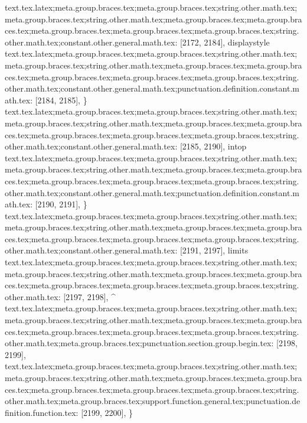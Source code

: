 {{{{{{{{{{{{{{{{{{{{{{{{{{{{{{{{{{{{{{{{{{{{{{{{{{{{{{{{{{{{{{{{text.tex.latex;meta.group.braces.tex;meta.group.braces.tex;string.other.math.tex;meta.group.braces.tex;string.other.math.tex;meta.group.braces.tex;meta.group.braces.tex;meta.group.braces.tex;meta.group.braces.tex;meta.group.braces.tex;string.other.math.tex;constant.other.general.math.tex: [2172, 2184], {displaystyle}
text.tex.latex;meta.group.braces.tex;meta.group.braces.tex;string.other.math.tex;meta.group.braces.tex;string.other.math.tex;meta.group.braces.tex;meta.group.braces.tex;meta.group.braces.tex;meta.group.braces.tex;meta.group.braces.tex;string.other.math.tex;constant.other.general.math.tex;punctuation.definition.constant.math.tex: [2184, 2185], {\}
text.tex.latex;meta.group.braces.tex;meta.group.braces.tex;string.other.math.tex;meta.group.braces.tex;string.other.math.tex;meta.group.braces.tex;meta.group.braces.tex;meta.group.braces.tex;meta.group.braces.tex;meta.group.braces.tex;string.other.math.tex;constant.other.general.math.tex: [2185, 2190], {intop}
text.tex.latex;meta.group.braces.tex;meta.group.braces.tex;string.other.math.tex;meta.group.braces.tex;string.other.math.tex;meta.group.braces.tex;meta.group.braces.tex;meta.group.braces.tex;meta.group.braces.tex;meta.group.braces.tex;string.other.math.tex;constant.other.general.math.tex;punctuation.definition.constant.math.tex: [2190, 2191], {\}
text.tex.latex;meta.group.braces.tex;meta.group.braces.tex;string.other.math.tex;meta.group.braces.tex;string.other.math.tex;meta.group.braces.tex;meta.group.braces.tex;meta.group.braces.tex;meta.group.braces.tex;meta.group.braces.tex;string.other.math.tex;constant.other.general.math.tex: [2191, 2197], {limits}
text.tex.latex;meta.group.braces.tex;meta.group.braces.tex;string.other.math.tex;meta.group.braces.tex;string.other.math.tex;meta.group.braces.tex;meta.group.braces.tex;meta.group.braces.tex;meta.group.braces.tex;meta.group.braces.tex;string.other.math.tex: [2197, 2198], {^}
text.tex.latex;meta.group.braces.tex;meta.group.braces.tex;string.other.math.tex;meta.group.braces.tex;string.other.math.tex;meta.group.braces.tex;meta.group.braces.tex;meta.group.braces.tex;meta.group.braces.tex;meta.group.braces.tex;string.other.math.tex;meta.group.braces.tex;punctuation.section.group.begin.tex: [2198, 2199], {{}
text.tex.latex;meta.group.braces.tex;meta.group.braces.tex;string.other.math.tex;meta.group.braces.tex;string.other.math.tex;meta.group.braces.tex;meta.group.braces.tex;meta.group.braces.tex;meta.group.braces.tex;meta.group.braces.tex;string.other.math.tex;meta.group.braces.tex;support.function.general.tex;punctuation.definition.function.tex: [2199, 2200], {\}
}}}}}}}}}}}}}}}}}}}}}}}}}}}}}}}}}}}}}}}}}}}}}}}}}}}}}}}}}}}}}}}}}}}}
